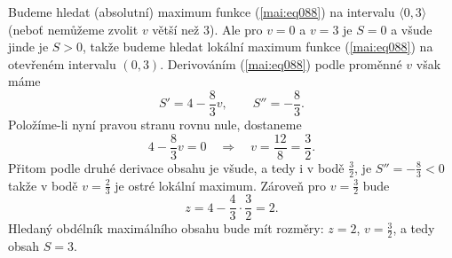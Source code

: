 \begin{mathexam}
  Budeme hledat (absolutní) maximum funkce (\ref{mai:eq088}) na intervalu \(\langle0,3\rangle\)
  (neboť nemůžeme zvolit \(v\) větší než 3). Ale pro \(v=0\) a \(v=3\) je \(S=0\) a všude jinde je
  \(S > 0\), takže budeme hledat lokální maximum funkce (\ref{mai:eq088}) na otevřeném intervalu
  \((0,3)\). Derivováním (\ref{mai:eq088}) podle proměnné \(v\) však máme
  \begin{equation*}
    S' = 4 - \dfrac{8}{3}v, \qquad S'' = -\dfrac{8}{3}.
  \end{equation*}
  Položíme-li nyní pravou stranu rovnu nule, dostaneme 
  \begin{equation*}
    4 - \dfrac{8}{3}v = 0 \quad\Rightarrow\quad v = \dfrac{12}{8} = \dfrac{3}{2}.
  \end{equation*}
  Přitom podle druhé derivace obsahu je všude, a tedy i v bodě \(\frac{3}{2}\), je
  \(S''=-\frac{8}{3}<0\) takže v bodě \(v = \frac{2}{3}\) je ostré lokální maximum. Zároveň pro
  \(v=\frac{3}{2}\) bude
  \begin{equation*}
    z = 4 - \dfrac{4}{3}\cdot\dfrac{3}{2} = 2.
  \end{equation*}
  Hledaný obdélník maximálního obsahu bude mít rozměry: \(z = 2\), \(v = \frac{3}{2}\), a tedy obsah
  \(S = 3\).    
\end{mathexam}